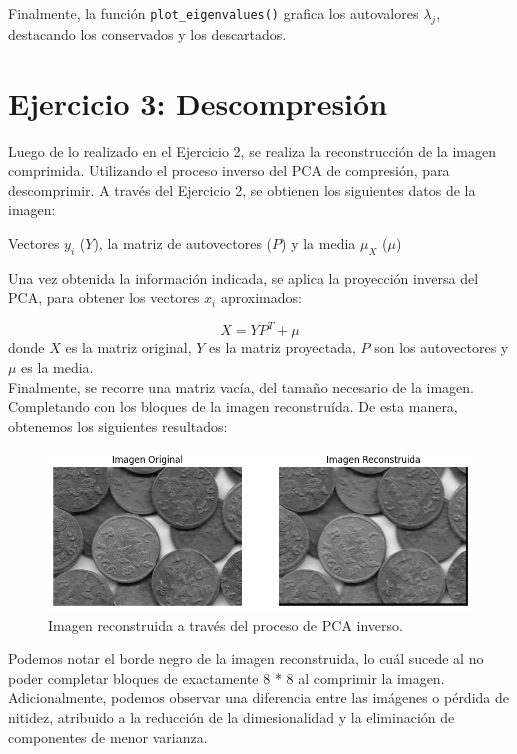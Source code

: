 \documentclass[a4paper,12pt]{article}
\numberwithin{equation}{section}
\numberwithin{figure}{section}
\begin{document}
Finalmente, la función \texttt{plot\_eigenvalues()} grafica los autovalores \(\lambda_j\), destacando los conservados y los descartados.


\section {Ejercicio 3: Descompresión}

Luego de lo realizado en el Ejercicio 2, se realiza la reconstrucción de la imagen comprimida. Utilizando el proceso inverso del PCA de compresión, para descomprimir.
A través del Ejercicio 2, se obtienen los siguientes datos de la imagen:

Vectores \(y_i\) (\(Y\)), la matriz de autovectores (\(P\)) y la media \(\mu_X\) (\(\mu\))

Una vez obtenida la información indicada, se aplica la proyección inversa del PCA, para obtener los vectores \(x_i\) aproximados:

\[
X = Y P^T + \mu
\]
donde \(X\) es la matriz original, \(Y\) es la matriz proyectada, \(P\) son los autovectores y \(\mu\) es la media.
\\
Finalmente, se recorre una matriz vacía, del tamaño necesario de la imagen. Completando con los bloques de la imagen reconstruída.
De esta manera, obtenemos los siguientes resultados:

\begin{figure}[H]
    \centering
    \includegraphics[width=1\textwidth]{Ejercicio3.png}
    \caption{Imagen reconstruida a través del proceso de PCA inverso.}
    \label{fig:ej3}
\end{figure}

Podemos notar el borde negro de la imagen reconstruida, lo cuál sucede al no poder completar bloques de exactamente 8 * 8 al comprimir la imagen.
Adicionalmente, podemos observar una diferencia entre las imágenes o pérdida de nitidez, atribuido a la reducción de la dimesionalidad y la eliminación de componentes de menor varianza.
\end{document}
